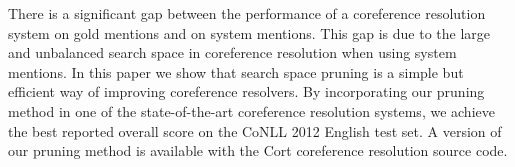 There is a significant gap between the performance of a coreference resolution system on gold mentions and on system mentions. This gap is due to the large and unbalanced search space in coreference resolution when using system mentions. In this paper we show that search space pruning is a simple but efficient way of improving coreference resolvers. By incorporating our pruning method in one of the state-of-the-art coreference resolution systems, we achieve the best reported overall score on the CoNLL 2012 English test set. A version of our pruning method is available with the Cort coreference resolution source code.
